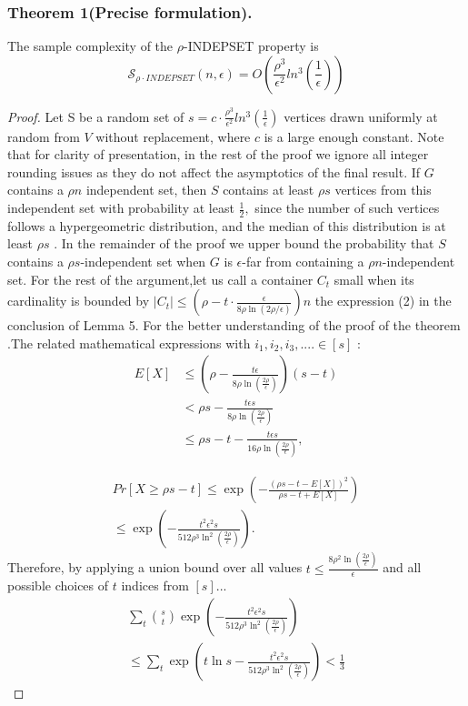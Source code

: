 \documentclass[preprint,11pt]{elsarticle}
\theoremstyle{definition}
\begin{document}
\begin{multicols}{2}
\subsubsection*{\textbf{Theorem 1}(Precise formulation).} The sample complexity of
the $\rho$-INDEPSET property is
\[\mathcal{S}_{\rho\cdot INDEPSET}(n,\epsilon)=O(\frac{\rho^{3}}{\epsilon^{2}}ln^{3}(\frac{1}{\epsilon}))\]
\begin{proof}
Let S be a random set of \(s=c\cdot\frac{\rho^{3}}{\epsilon^{2}}ln^{3}(\frac{1}{\epsilon})\) vertices
drawn uniformly at random from $V$ without replacement,
where $c$ is a large enough constant. Note that for clarity of
presentation, in the rest of the proof we ignore all integer
rounding issues as they do not affect the asymptotics of the
final result.
If $G$ contains a $\rho n$ independent set, then $S$ contains at least
$\rho s$ vertices from this independent set with probability at least
\(\frac{1}{2},\) since the number of such vertices follows a hypergeometric
distribution, and the median of this distribution is at least
$\rho s$  \cite{Neu70}\cite{KB80}.
In the remainder of the proof we upper bound the probability
that $S$ contains a $\rho s$-independent set when $G$ is $\epsilon$-far from
containing a $\rho n$-independent set. For the rest of the argument,let us call a container \(C_{t}\) small when its cardinality is bounded by 
$|C_t|\leq (\rho - t\cdot \frac{\epsilon}{8\rho \ln(2\rho/\epsilon)})n$  the expression (2) in the conclusion of Lemma 5. For the better understanding of the proof of the theorem .The related mathematical expressions with $i_1,i_2,i_3,....\in [s]$ :
\begin{align*}
E[X] &\leq \left(\rho - \frac{t\epsilon}{8\rho\ln\left(\frac{2\rho}{\epsilon}\right)}\right)(s-t) \nonumber \\
     &< \rho s - \frac{t\epsilon s}{8\rho\ln\left(\frac{2\rho}{\epsilon}\right)} \nonumber \\
     &\leq \rho s - t - \frac{t\epsilon s}{16\rho\ln\left(\frac{2\rho}{\epsilon}\right)},
\end{align*}


\begin{align*}
Pr[X \geq \rho s - t] \leq \exp \left( -\frac{(\rho s - t - E[X])^2}{\rho s - t + E[X]} \right) \\
\leq \exp \left( -\frac{t^2 \epsilon^2 s}{512 \rho^3 \ln^2(\frac{2 \rho}{\epsilon})} \right).
\end{align*}
Therefore, by applying a union bound over all values $t \leq \frac{8\rho^2 \ln(\frac{ 2\rho}{\epsilon})}{\epsilon}$
 and all possible choices of $t$ indices from $[s]$...
\begin{align*}
\sum_{t}\binom{s}{t} \exp ( -\frac{t^2 \epsilon^2 s}{512 \rho^3 \ln^2(\frac{2 \rho}{\epsilon})})\\
\leq \sum_{t}^{} \exp ( t \ln s - \frac{t^2 \epsilon^2 s}{512 \rho^3 \ln^2(\frac{2 \rho}{\epsilon})})< \frac{1}{3}
\end{align*}
\end{proof}

\end{multicols}
\end{document}
